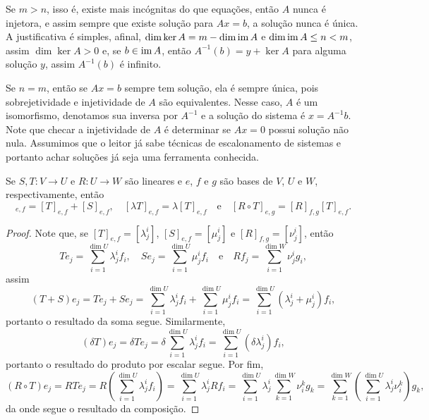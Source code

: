 Se $m > n$, isso é, existe mais incógnitas do que equações, então $A$ nunca é injetora, e assim sempre que existe solução para $Ax = b$, a solução nunca é única. A justificativa é simples, afinal, $\dim \ker A = m - \dim \operatorname{im} A$ e $\dim \operatorname{im} A \leq n < m$, assim $\dim \ker A > 0$ e, se $b \in \operatorname{im} A$, então $A^{-1}(b) = y + \ker A$ para alguma solução $y$, assim $A^{-1}(b)$ é infinito.

Se $n = m$, então se $Ax = b$ sempre tem solução, ela é sempre única, pois sobrejetividade e injetividade de $A$ são equivalentes. Nesse caso, $A$ é um isomorfismo, denotamos sua inversa por $A^{-1}$ e a solução do sistema é $x = A^{-1}b$. Note que checar a injetividade de $A$ é determinar se $Ax = 0$ possui solução não nula. Assumimos que o leitor já sabe técnicas de escalonamento de sistemas e portanto achar soluções já seja uma ferramenta conhecida.

\begin{proposition}
    Se $S, T \colon V \to U$ e $R \colon U \to W$ são lineares e $e$, $f$ e $g$ são bases de $V$, $U$ e $W$, respectivamente, então \begin{equation}
        [T + S]_{e, f} = [T]_{e, f} + [S]_{e, f}, \quad [\lambda T]_{e, f} = \lambda [T]_{e, f} \quad \text{e} \quad [R \circ T]_{e, g} = [R]_{f,g} [T]_{e,f}.
    \end{equation}
\end{proposition}
\begin{proof}
    Note que, se $[T]_{e,f} = [\lambda^i_j]$, $[S]_{e,f} = [\mu^i_j]$ e $[R]_{f,g} = [\nu^i_j]$, então \begin{equation}
        Te_j = \sum_{i = 1}^{\dim U} \lambda^i_j f_i, \quad Se_j = \sum_{i = 1}^{\dim U} \mu^i_j f_i \quad \text{e} \quad Rf_j = \sum_{i = 1}^{\dim W} \nu^i_j g_i,
    \end{equation} assim \begin{equation}
        (T + S)e_j = Te_j + Se_j = \sum_{i = 1}^{\dim U} \lambda^i_j f_i + \sum_{i = 1}^{\dim U} \mu^i_j f_i = \sum_{i = 1}^{\dim U} (\lambda^i_j + \mu^i_j) f_i,
    \end{equation} portanto o resultado da soma segue. Similarmente, \begin{equation}
        (\delta T)e_j = \delta Te_j = \delta \sum_{i = 1}^{\dim U} \lambda^i_j f_i = \sum_{i = 1}^{\dim U} (\delta \lambda^i_j) f_i,
    \end{equation} portanto o resultado do produto por escalar segue. Por fim, \begin{equation}
        (R \circ T)e_j = RTe_j = R\left(\sum_{i = 1}^{\dim U} \lambda^i_j f_i\right) = \sum_{i = 1}^{\dim U} \lambda^i_j Rf_i = \sum_{i = 1}^{\dim U} \lambda^i_j \sum_{k = 1}^{\dim W} \nu^k_i g_k = \sum_{k = 1}^{\dim W} \left(\sum_{i = 1}^{\dim U} \lambda^i_j \nu^k_i\right) g_k,
    \end{equation} da onde segue o resultado da composição.
\end{proof}

